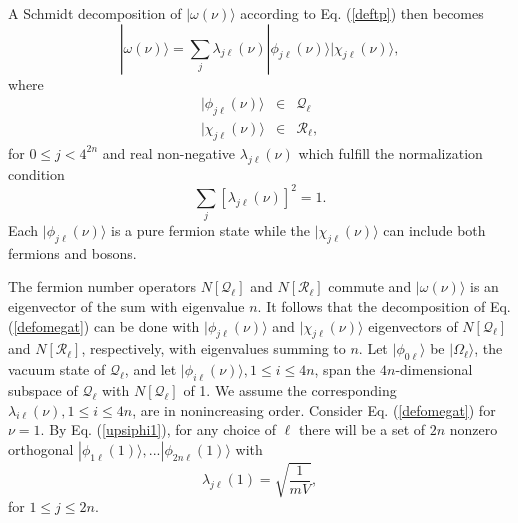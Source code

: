 \documentclass[twocolumn,amsmath,amssymb]{revtex4-1}
\begin{document}
A Schmidt decomposition of $|\omega(\nu) \rangle $ according to
Eq. (\ref{deftp}) then becomes
\begin{equation}
\label{defomegat}
|\omega(\nu) \rangle  =  \sum_j \lambda_{j\ell}(\nu) 
|\phi_{j\ell}(\nu) \rangle |\chi_{j\ell}(\nu) \rangle ,
\end{equation}
where 
\begin{subequations}
\begin{eqnarray}
\label{defphit2}
|\phi_{j\ell}(\nu) \rangle  & \in & \mathcal{Q}_\ell \\
\label{defchit}
|\chi_{j\ell}( \nu) \rangle  & \in & \mathcal{R}_\ell,
\end{eqnarray}
\end{subequations}
for $0 \leq j < 4^{2n}$ and real non-negative $\lambda_{j\ell}( \nu)$ which
fulfill the normalization condition
\begin{equation}
\label{normalization}
\sum_j [ \lambda_{j\ell}( \nu)]^2 =  1.
\end{equation}
Each $|\phi_{j\ell}(\nu) \rangle $ is a pure fermion state while
the $|\chi_{j\ell}(\nu) \rangle $ can include both fermions and bosons.


The fermion number operators $N[\mathcal{Q}_\ell]$ and $N[\mathcal{R}_\ell]$ commute and
$|\omega(\nu) \rangle $ is an eigenvector of the sum with eigenvalue $n$. It follows that 
the decomposition of Eq. (\ref{defomegat}) can be done with $|\phi_{j\ell}( \nu) \rangle $ 
and $|\chi_{j\ell}(\nu) \rangle $
eigenvectors of $N[\mathcal{Q}_\ell]$ and $N[\mathcal{R}_\ell]$, respectively, with
eigenvalues summing to $n$. Let $|\phi_{0\ell} \rangle $ be $|\Omega_\ell \rangle $, the vacuum state
of $\mathcal{Q}_\ell$, and let 
$|\phi_{i\ell} (\nu) \rangle , 1 \le i \le 4n$, 
span the $4n$-dimensional subspace of $\mathcal{Q}_\ell$
with $N[\mathcal{Q}_\ell]$ of 1. 
We assume the corresponding $\lambda_{i\ell}( \nu), 1 \le i \le 4n$,
are in nonincreasing order.
Consider Eq. (\ref{defomegat}) for $\nu = 1$. By Eq. (\ref{upsiphi1}), for any choice
of $\ell$ there will be a set of $2n$ nonzero orthogonal
$|\phi_{1\ell}( 1) \rangle , ... |\phi_{2n\ell}( 1) \rangle $ with 
\begin{equation}
\label{lambda1}
\lambda_{j\ell}( 1) = \sqrt{\frac{1}{mV}},
\end{equation}
for $1 \le j \le 2n$. 
\end{document}
